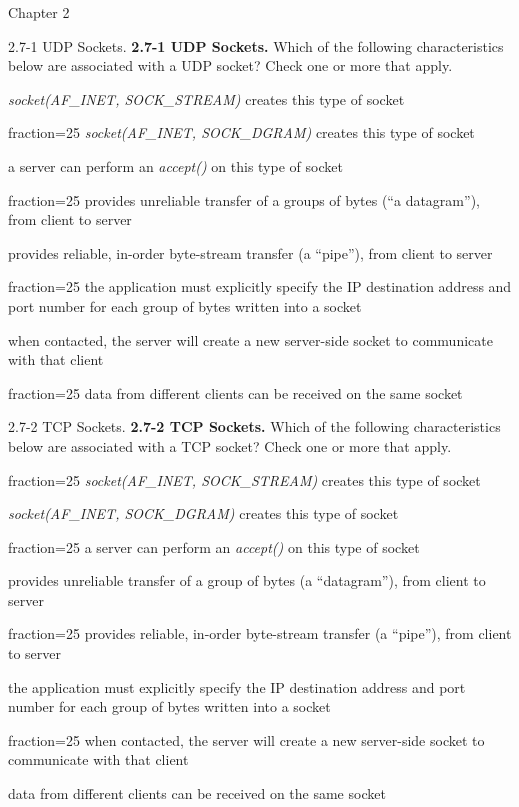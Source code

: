 \documentclass[11pt]{article}
\begin{document}
\begin{quiz}{Chapter 2}
\begin{multi}[points=1,shuffle,multiple]{2.7-1 UDP Sockets.}
\textbf{2.7-1 UDP Sockets.} 
Which of the following characteristics below are associated with a UDP socket? Check one or more that apply. 
\item \emph{socket(AF\_INET, SOCK\_STREAM)} creates this type of socket
\item[fraction=25] \emph{socket(AF\_INET, SOCK\_DGRAM)} creates this type of socket
\item a server can perform an \emph{accept()} on this type of socket
\item[fraction=25] provides unreliable transfer of a groups of bytes (``a datagram''), from client to server
\item provides reliable, in-order byte-stream transfer (a ``pipe''), from client to server
\item[fraction=25] the application must explicitly specify the IP destination address and port number for each group of bytes written into a socket
\item when contacted, the server will create a new server-side socket to communicate with that client
\item[fraction=25] data from different clients can be received on the same socket
\end{multi}

\begin{multi}[points=1,shuffle,multiple]{2.7-2 TCP Sockets.}
\textbf{2.7-2 TCP Sockets.} 
Which of the following characteristics below are associated with a TCP socket? Check one or more that apply. 
\item[fraction=25] \emph{socket(AF\_INET, SOCK\_STREAM)} creates this type of socket
\item \emph{socket(AF\_INET, SOCK\_DGRAM)} creates this type of socket
\item[fraction=25] a server can perform an \emph{accept()} on this type of socket
\item provides unreliable transfer of a group of bytes (a ``datagram''), from client to server
\item[fraction=25] provides reliable, in-order byte-stream transfer (a ``pipe''), from client to server
\item the application must explicitly specify the IP destination address and port number for each group of bytes written into a socket
\item[fraction=25] when contacted, the server will create a new server-side socket to communicate with that client
\item data from different clients can be received on the same socket
\end{multi}


\end{quiz}
\end{document}
